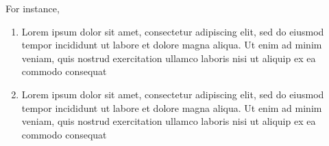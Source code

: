 \documentclass[11pt,a4paper]{report}
\begin{document}
For instance, 

\begin{enumerate}
    \item Lorem ipsum dolor sit amet, consectetur adipiscing elit, sed do eiusmod tempor incididunt ut labore et dolore magna aliqua. Ut enim ad minim veniam, quis nostrud exercitation ullamco laboris nisi ut aliquip ex ea commodo consequat
    \item Lorem ipsum dolor sit amet, consectetur adipiscing elit, sed do eiusmod tempor incididunt ut labore et dolore magna aliqua. Ut enim ad minim veniam, quis nostrud exercitation ullamco laboris nisi ut aliquip ex ea commodo consequat
\end{enumerate}

\pagebreak

\tableofcontents
\end{document}
